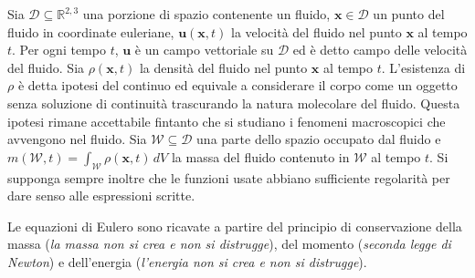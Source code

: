 Sia $\mathcal{D} \subseteq \mathbb{R}^{2,3}$ una porzione di spazio contenente un fluido, $\mathbf{x} \in \mathcal{D}$ un punto del fluido in coordinate euleriane, $\mathbf{u}(\mathbf{x},t)$ la velocità del fluido nel punto $\mathbf{x}$ al tempo $t$. Per ogni tempo $t$, $\mathbf{u}$ è un campo vettoriale su $\mathcal{D}$ ed è detto campo delle velocità del fluido. Sia $\rho(\mathbf{x},t)$ la densità del fluido nel punto $\mathbf{x}$ al tempo $t$.  L'esistenza di $\rho$ è detta ipotesi del continuo ed equivale a considerare il corpo come un oggetto senza soluzione di continuità trascurando la natura molecolare del fluido. Questa ipotesi rimane accettabile fintanto che si studiano i fenomeni macroscopici che avvengono nel fluido. Sia $\mathcal{W} \subseteq \mathcal{D}$ una parte dello spazio occupato dal fluido e $m(\mathcal{W},t)= \int_{\mathcal{W}}\rho(\mathbf{x},t) \, dV$ la massa del fluido contenuto in $\mathcal{W}$ al tempo $t$. Si supponga sempre inoltre che le funzioni usate abbiano sufficiente regolarità per dare senso alle espressioni scritte. 

Le equazioni di Eulero sono ricavate a partire del principio di conservazione della massa (\emph{la massa non si crea e non si distrugge}), del momento (\emph{seconda legge di Newton}) e dell'energia (\emph{l'energia non si crea e non si distrugge}).

